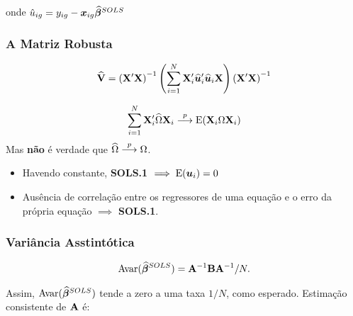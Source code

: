 \documentclass[11pt, oneside, a4paper, article]{article}
\numberwithin{equation}{section}
\begin{document}
\noindent onde $\hat{u}_{ig} = y_{ig} - \boldsymbol{x}_{ig} \widehat{\boldsymbol{\beta}}^{SOLS}$

\subsubsection{A Matriz Robusta}

\vspace{-2 em}
\begin{align*}
	\widehat{\mathbf{V}} =
	\left( \mathbf{X}' \mathbf{X} \right)^{-1}
	\left( \sum_{i=1}^{N} \mathbf{X}_{i}' \widehat{\boldsymbol{u}}_{i}' \widehat{\boldsymbol{u}}_{i} \mathbf{X} \right)
	\left( \mathbf{X}' \mathbf{X} \right)^{-1}
\end{align*}

\vspace{-1 em}
\begin{align*}
	\sum_{i=1}^{N} \mathbf{X}_{i}' \widehat{\Omega} \mathbf{X}_{i}  \overset{p}{\longrightarrow}  
	\text{E}(\mathbf{X}_{i} \Omega \mathbf{X}_{i})
\end{align*}
Mas \textbf{não} é verdade que $\widehat{\Omega}  \overset{p}{\longrightarrow}  \Omega$.

\begin{itemize}[noitemsep]
	\item
		Havendo constante, \textbf{SOLS.1} $\implies \text{E}(\boldsymbol{u}_{i})=0$
	\item
		Ausência de correlação entre os regressores de uma equação e o erro da própria equação $\implies$ \textbf{SOLS.1}.
\end{itemize}


\subsubsection{Variância Asstintótica}

\begin{center}
\end{center}

\vspace{-1 em}
\begin{align}\label{eq:avar:sols}
	\text{Avar}(\widehat{\boldsymbol{\beta}}^{SOLS}) = \mathbf{A}^{-1} \mathbf{B} \mathbf{A}^{-1}/N.
\end{align}

Assim, $\text{Avar}(\widehat{\boldsymbol{\beta}}^{SOLS})$ tende a zero a uma taxa $1/N$, como esperado.
Estimação consistente de $\mathbf{A}$ é:
\end{document}
